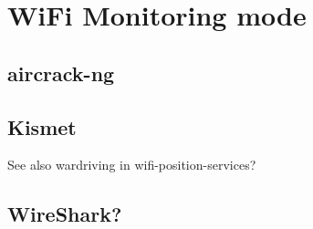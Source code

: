\documentclass[../wifi-security.tex]{subfiles}
\begin{document}
\chapter{WiFi Monitoring mode}

\section{aircrack-ng}

\section{Kismet}

See also wardriving in wifi-position-services?

\section{WireShark?}
\end{document}
